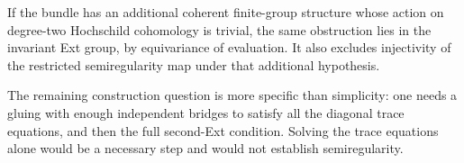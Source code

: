 If the bundle has an additional coherent finite-group structure
whose action on degree-two Hochschild cohomology is trivial, the same
obstruction lies in the invariant Ext group, by equivariance of
evaluation.  It also excludes injectivity of the restricted
semiregularity map under that additional hypothesis.

The remaining construction question is more specific than simplicity:
one needs a gluing with enough independent bridges to satisfy all
the diagonal trace equations, and then the full second-Ext condition.
Solving the trace equations alone would be a necessary step and would
not establish semiregularity.
